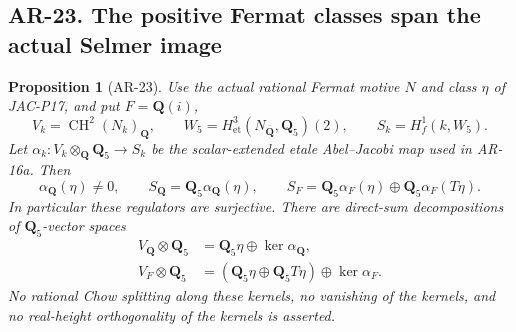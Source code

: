 \documentclass[11pt,a4paper]{article}
\newtheorem{proposition}[theorem]{Proposition}
\begin{document}
\subsection*{AR-23. The positive Fermat classes span the actual Selmer image}

\begin{proposition}[AR-23]
Use the actual rational Fermat motive $N$ and class $\eta$ of JAC-P17,
and put $F=\mathbf Q(i)$,
\[
 V_k=\operatorname{CH}^2(N_k)_{\mathbf Q},\qquad
 W_5=H^3_{\mathrm{et}}(N_{\overline{\mathbf Q}},\mathbf Q_5)(2),
 \qquad S_k=H^1_f(k,W_5).
\]
Let
$\alpha_k:V_k\otimes_{\mathbf Q}\mathbf Q_5\to S_k$
be the scalar-extended etale Abel--Jacobi map used in AR-16a.
Then
\[
 \alpha_{\mathbf Q}(\eta)\ne0,\qquad
 S_{\mathbf Q}=\mathbf Q_5\alpha_{\mathbf Q}(\eta),
 \qquad
 S_F=\mathbf Q_5\alpha_F(\eta)
       \oplus\mathbf Q_5\alpha_F(T\eta).              \tag{AR.23a}
\]
In particular these regulators are surjective.  There are direct-sum
decompositions of $\mathbf Q_5$-vector spaces
\[
 \begin{split}
 V_{\mathbf Q}\otimes\mathbf Q_5
   &=\mathbf Q_5\eta\oplus\ker\alpha_{\mathbf Q},\\
 V_F\otimes\mathbf Q_5
   &=(\mathbf Q_5\eta\oplus\mathbf Q_5 T\eta)
                                      \oplus\ker\alpha_F.
 \end{split}                                                   \tag{AR.23b}
\]
No rational Chow splitting along these kernels, no vanishing of the
kernels, and no real-height orthogonality of the kernels is asserted.
\end{proposition}
\end{document}
